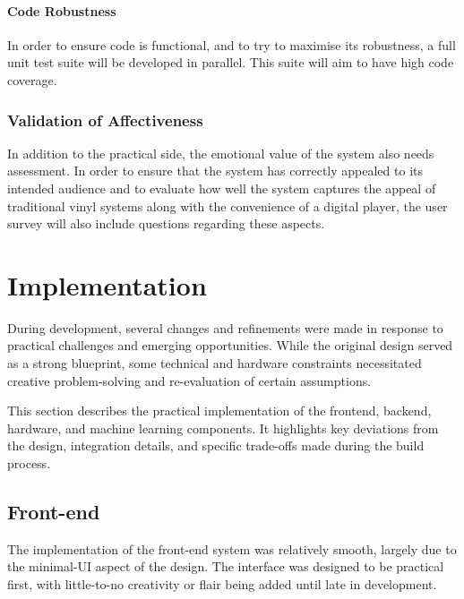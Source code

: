                 \paragraph{Code Robustness} In order to ensure code is functional, and to try to maximise its robustness, a full unit test suite will be developed in parallel. This suite will aim to have high code coverage.
        
            \subsubsection{Validation of Affectiveness}
                
                In addition to the practical side, the emotional value of the system also needs assessment. In order to ensure that the system has correctly appealed to its intended audience and to evaluate how well the system captures the appeal of traditional vinyl systems along with the convenience of a digital player, the user survey will also include questions regarding these aspects.
    
    \section{Implementation}
    
        During development, several changes and refinements were made in response to practical challenges and emerging opportunities. While the original design served as a strong blueprint, some technical and hardware constraints necessitated creative problem-solving and re-evaluation of certain assumptions.
    
        This section describes the practical implementation of the frontend, backend, hardware, and machine learning components. It highlights key deviations from the design, integration details, and specific trade-offs made during the build process.
    
        \subsection{Front-end}
    
    
            The implementation of the front-end system was relatively smooth, largely due to the minimal-UI aspect of the design. The interface was designed to be practical first, with little-to-no creativity or flair being added until late in development.
    
